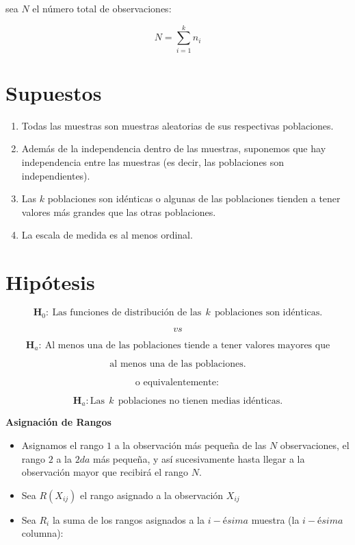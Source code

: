 \documentclass[
  a4paper,
  oneside,
  openany]{book}
\begin{document}
sea \(N\) el número total de observaciones:

\[ N= \sum_{i=1}^{k} n_{i}\]

\hypertarget{supuestos-7}{%
\section{Supuestos}\label{supuestos-7}}

\begin{enumerate}
\def\labelenumi{\arabic{enumi})}
\item
  Todas las muestras son muestras aleatorias de sus respectivas poblaciones.
\item
  Además de la independencia dentro de las muestras, suponemos que hay independencia entre las muestras (es decir, las poblaciones son independientes).
\item
  Las \(k\) poblaciones son idénticas o algunas de las poblaciones tienden a tener valores más grandes que las otras poblaciones.
\item
  La escala de medida es al menos ordinal.
\end{enumerate}

\hypertarget{hipuxf3tesis-6}{%
\section{Hipótesis}\label{hipuxf3tesis-6}}

\[\textbf{H}_0: \ \mbox{Las funciones de distribución de las} \ \  k \ \ \mbox{poblaciones son idénticas.}\]

\[vs\]

\[\textbf{H}_a: \ \mbox{Al menos una de las poblaciones tiende a tener valores mayores que}\]

\[\mbox{al menos una de las poblaciones.}\]

\[\mbox{o equivalentemente}:\]

\[\textbf{H}_a: \mbox{Las} \ \ k \ \  \mbox{poblaciones no tienen medias idénticas.}\]

\textbf{Asignación de Rangos}

\begin{itemize}
\item
  Asignamos el rango \(1\) a la observación más pequeña de las \(N\) observaciones, el rango \(2\) a la \(2da\) más pequeña, y así sucesivamente hasta llegar a la observación mayor que recibirá el rango \(N\).
\item
  Sea \(R(X_{ij})\) el rango asignado a la observación \(X_{ij}\)
\item
  Sea \(R_{i}\) la suma de los rangos asignados a la \(i-ésima\) muestra (la \(i-ésima\) columna):
\end{itemize}
\end{document}
